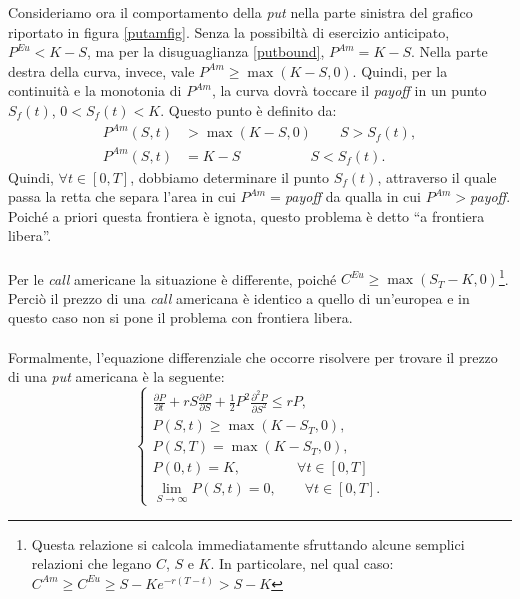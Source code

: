 \documentclass[a4paper,10pt]{report}
\newcommand{\der}[2]{\frac{\partial #1}{\partial #2}}
\newcommand{\dder}[2]{\frac{\partial^2 #1}{\partial #2^2}}
\theoremstyle{plain}
\theoremstyle{definition}
\theoremstyle{remark}
\begin{document}
Consideriamo ora il comportamento della \emph{put} nella parte sinistra del grafico riportato in figura \ref{putamfig}. Senza la possibilt\`a di esercizio anticipato, $P^{Eu}<K-S$, ma per la disuguaglianza \ref{putbound}, $P^{Am}=K-S$. Nella parte destra della curva, invece, vale $P^{Am}\geq \max(K-S,0)$. Quindi, per la continuit\`a e la monotonia di $P^{Am}$, la curva dovr\`a toccare il \emph{payoff} in un punto $S_f(t)$, $0<S_f(t)<K$. Questo punto \`e definito da:
\begin{align*}
P^{Am}(S,t)&>\max(K-S,0)\qquad S>S_f(t),\\
P^{Am}(S,t)&=K-S\qquad\qquad\quad S<S_f(t).
\end{align*}
Quindi, $\forall t\in[0,T]$, dobbiamo determinare il punto $S_f(t)$, attraverso il quale passa la retta che separa l'area in cui $P^{Am}=$\emph{payoff} da qualla in cui $P^{Am}>$\emph{payoff}. Poich\'e a priori questa frontiera \`e ignota, questo problema \`e detto ``a frontiera libera''.\\\\Per le \emph{call} americane la situazione \`e differente, poich\'e $C^{Eu}\geq \max(S_T-K,0)$\footnote{Questa relazione si calcola immediatamente sfruttando alcune semplici relazioni che legano $C$, $S$ e $K$. In particolare, nel qual caso: $C^{Am}\geq C^{Eu} \geq S-Ke^{-r(T-t)} > S-K$}. Perci\`o il prezzo di una \emph{call} americana \`e identico a quello di un'europea e in questo caso non si pone il problema con frontiera libera.\\\\Formalmente, l'equazione differenziale che occorre risolvere per trovare il prezzo di una \emph{put} americana \`e la seguente:
\begin{equation}
\begin{cases}
\displaystyle
\der{P}{t}+r S \der{P}{S} +\frac{1}{2}P^2\dder{P}{S}\leq rP,\\
P(S,t)\geq \max(K-S_T,0),\\
P(S,T)=\max(K-S_T,0),\\
P(0,t)=K,\qquad\qquad\forall t\in[0,T]\\
\lim\limits_{S\to\infty}P(S,t)=0,\qquad\forall t\in[0,T].
\end{cases}
\label{putam1d}
\end{equation}
\end{document}

